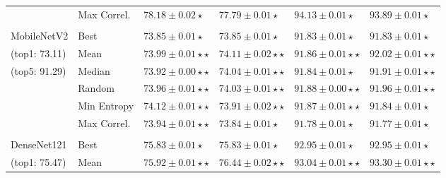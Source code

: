 \begin{table}[h!]
\begin{tabularx}{\textwidth}{XX|YY|YY}
									& Max Correl.              & $78.18\pm 0.02\star$                 & $77.79\pm0.01\star$                  & $94.13\pm0.01\star$                 & $93.89\pm0.01\star$                 \\
									&                          &                                      &                                      &                                     &                                     \\
	 { MobileNetV2}                 & Best                     & $73.85 \pm 0.01 \star$               & $73.85 \pm 0.01 \star$               & $91.83 \pm 0.01\star$               & $91.83 \pm 0.01\star$               \\
	 (top1: 73.11)                    & Mean                     & $73.99 \pm 0.01 \star\star$          & $\mathbf{74.11 \pm 0.02} \star\star$ & $91.86 \pm 0.01\star\star$          & $\mathbf{92.02 \pm 0.01\star\star}$ \\
	 (top5: 91.29)                    & Median                   & $73.92 \pm 0.00\star\star $          & $74.04 \pm 0.01 \star\star$          & $91.84 \pm 0.01\star$               & $91.91 \pm 0.01\star\star$          \\
									& Random                   & $73.96 \pm 0.01 \star\star$          & $74.03 \pm 0.01\star\star$           & $\mathbf{91.88 \pm 0.00\star\star}$ & $91.96 \pm 0.01\star\star$          \\
									& Min Entropy              & $\mathbf{74.12\pm0.01\star\star}$    & $73.91\pm0.02\star\star$             & $91.87\pm0.01\star\star$            & $91.84\pm0.01\star$                 \\
									& Max Correl.              & $73.94\pm0.01\star\star$             & $73.84\pm0.01\star$                  & $91.78\pm0.01\star$                 & $91.77\pm0.01\star$                 \\
									&                          &                                      &                                      &                                     &                                     \\
	 { DenseNet121}                 & Best                     & $ 75.83 \pm 0.01 \star$              & $ 75.83 \pm 0.01 \star$              & $92.95 \pm 0.01\star$               & $92.95 \pm 0.01 \star$              \\
	 (top1: 75.47)                    & Mean                     & $75.92 \pm 0.01 \star\star$          & $\mathbf{76.44 \pm 0.02} \star\star$ & $93.04 \pm 0.01\star\star$          & $93.30 \pm 0.01\star\star$          \\

\end{tabularx}
\end{table}

